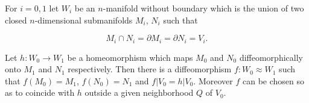 For $i = 0, 1$ let $W_i$ be an $n$-manifold without boundary which is the union of two closed $n$-dimensional submanifolds $M_i$, $N_i$ such that

$$M_i \cap N_i = \partial M_i = \partial N_i = V_i.$$

Let $h: W_0 \to W_1$ be a homeomorphism which maps $M_0$ and $N_0$ diffeomorphically onto $M_1$ and $N_1$ respectively. Then there is a diffeomorphism $f: W_0 \approx W_1$ such that $f(M_0) = M_1$, $f(N_0) = N_1$ and $f|V_0 = h|V_0$. Moreover $f$ can be chosen so as to coincide with $h$ outside a given neighborhood $Q$ of $V_0$.
